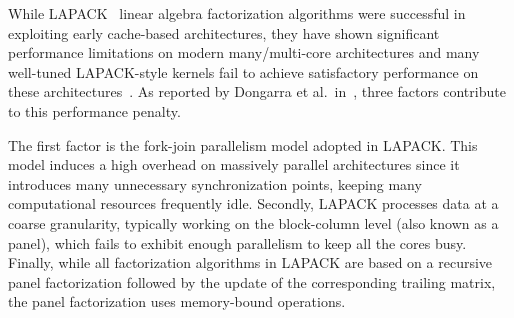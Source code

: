 While LAPACK~\cite{anderson1999lapack} linear algebra factorization
algorithms were successful in exploiting early cache-based
architectures, they have shown significant performance
limitations on modern many/multi-core architectures and many
well-tuned LAPACK-style kernels
fail to achieve satisfactory performance on these
architectures~\cite{agullo2009comparative}.
As reported by Dongarra et al\@.~in~\cite{dongarra2011achieving},
three factors contribute to this
performance penalty.

The first factor is the fork-join parallelism
model adopted in LAPACK. This model induces a high overhead on
massively parallel architectures since it introduces many unnecessary
synchronization points, keeping many computational resources frequently
idle.
Secondly, LAPACK processes data at a coarse granularity,
typically working on the block-column level (also known as a panel),
which fails to exhibit enough parallelism to
keep all the cores busy.
Finally, while all factorization algorithms in LAPACK are based on
a recursive panel factorization followed by the update of the
corresponding trailing matrix,
the panel factorization uses memory-bound operations.

